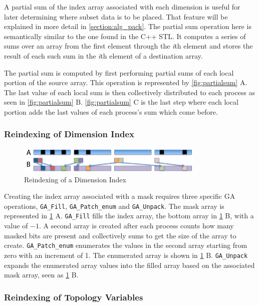 A partial sum of the index array associated with each dimension is useful for
later determining where subset data is to be placed.  That feature will be
explained in more detail in \ref{section:alg_pack}.  The partial sum operation
here is semantically similar to the one found in the C++ STL\cite{CXXSTL}.  It
computes a series of sums over an array from the first element through the
\emph{i}th element and stores the result of each such sum in the \emph{i}th
element of a destination array.

The partial sum is computed by first performing partial sums of each local
portion of the source array.  This operation is represented by
\ref{fig:partialsum} A.  The last value of each local sum is then collectively
distributed to each process as seen in \ref{fig:partialsum} B.
\ref{fig:partialsum} C is the last step where each local portion adds the last
values of each process's sum which come before.

\subsubsection{Reindexing of Dimension Index}

\begin{figure}[!t]
\center
\includegraphics[width=3.5in]{images/unpack_label}
\caption{Reindexing of a Dimension Index}
\label{fig:unpack}
\end{figure}

Creating the index array associated with a mask requires three specific GA
operations, \verb=GA_Fill=, \verb=GA_Patch_enum= and \verb=GA_Unpack=.  The
mask array is represented in \ref{fig:unpack} A.  \verb=GA_Fill= fills the
index array, the bottom array in \ref{fig:unpack} B,  with a value of $-1$.  A
second array is created after each process counts how many masked bits are
present and collectively sums to get the size of the array to create.
\verb=GA_Patch_enum= enumerates the values in the second array starting from
zero with an increment of 1.  The enumerated array is shown in
\ref{fig:unpack} B.  \verb=GA_Unpack= expands the enumerated array values into
the filled array based on the associated mask array, seen as \ref{fig:unpack}
B.

\subsubsection{Reindexing of Topology Variables}

